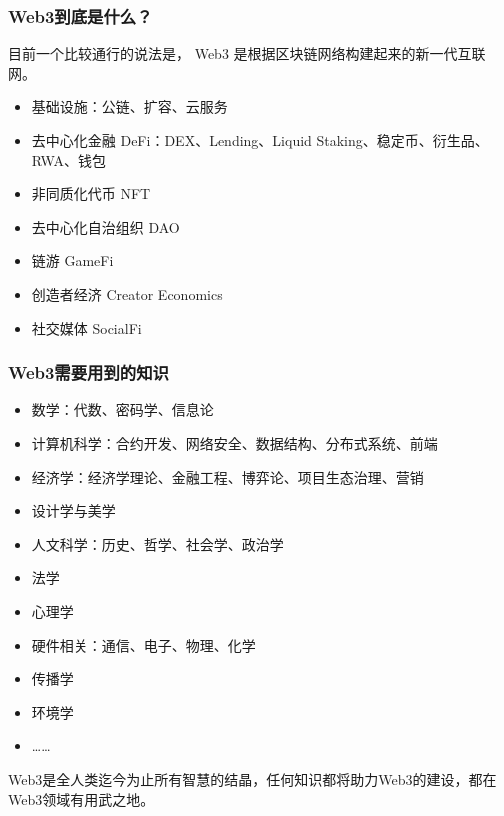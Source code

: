 \documentclass{beamer}
\begin{document}
\begin{frame}
    \frametitle{Web3到底是什么？}

    目前一个比较通行的说法是， Web3 是根据区块链网络构建起来的新一代互联网。

    \begin{itemize}
        \item 基础设施：公链、扩容、云服务
        \item 去中心化金融 DeFi：DEX、Lending、Liquid Staking、稳定币、衍生品、RWA、钱包
        \item 非同质化代币 NFT
        \item 去中心化自治组织 DAO
        \item 链游 GameFi
        \item 创造者经济 Creator Economics
        \item 社交媒体 SocialFi
    \end{itemize}

\end{frame}

\begin{frame}
    \frametitle{Web3需要用到的知识}

    \begin{itemize}
        \item 数学：代数、密码学、信息论
        \item 计算机科学：合约开发、网络安全、数据结构、分布式系统、前端
        \item 经济学：经济学理论、金融工程、博弈论、项目生态治理、营销
        \item 设计学与美学
        \item 人文科学：历史、哲学、社会学、政治学
        \item 法学
        \item 心理学
        \item 硬件相关：通信、电子、物理、化学
        \item 传播学
        \item 环境学
        \item ……
    \end{itemize}

    Web3是全人类迄今为止所有智慧的结晶，任何知识都将助力Web3的建设，都在Web3领域有用武之地。

\end{frame}
\end{document}

